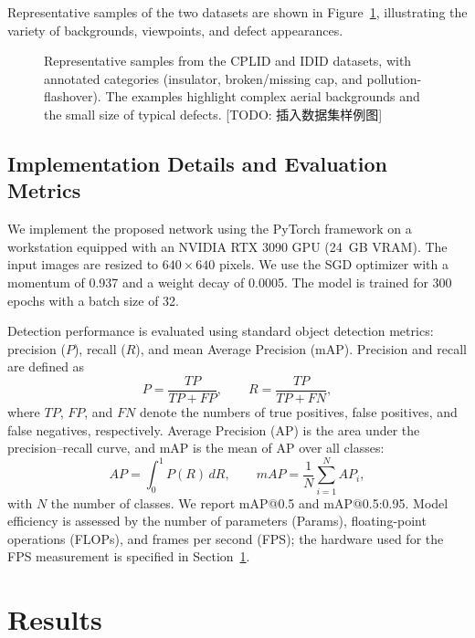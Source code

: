 \documentclass[sensors,article,submit,pdftex,moreauthors]{Definitions/mdpi}
\begin{document}
Representative samples of the two datasets are shown in Figure~\ref{fig:dataset}, illustrating the variety of backgrounds, viewpoints, and defect appearances.

\begin{figure}[H]
\centering
\caption{Representative samples from the CPLID and IDID datasets, with annotated categories (insulator, broken/missing cap, and pollution-flashover). The examples highlight complex aerial backgrounds and the small size of typical defects. [TODO: 插入数据集样例图]}
\label{fig:dataset}
\end{figure}

\subsection{Implementation Details and Evaluation Metrics}

We implement the proposed network using the PyTorch framework on a workstation equipped with an NVIDIA RTX 3090 GPU (24~GB VRAM). The input images are resized to $640\times640$ pixels. We use the SGD optimizer with a momentum of 0.937 and a weight decay of 0.0005. The model is trained for 300 epochs with a batch size of 32.

Detection performance is evaluated using standard object detection metrics: precision ($P$), recall ($R$), and mean Average Precision (mAP). Precision and recall are defined as
\begin{equation}
P = \frac{TP}{TP + FP}, \qquad R = \frac{TP}{TP + FN},
\end{equation}
where $TP$, $FP$, and $FN$ denote the numbers of true positives, false positives, and false negatives, respectively. Average Precision (AP) is the area under the precision--recall curve, and mAP is the mean of AP over all classes:
\begin{equation}
AP = \int_{0}^{1} P(R)\, dR, \qquad mAP = \frac{1}{N}\sum_{i=1}^{N} AP_i ,
\end{equation}
with $N$ the number of classes. We report mAP@0.5 and mAP@0.5:0.95. Model efficiency is assessed by the number of parameters (Params), floating-point operations (FLOPs), and frames per second (FPS); the hardware used for the FPS measurement is specified in Section~\ref{sec:results}.

\section{Results}\label{sec:results}
\end{document}
